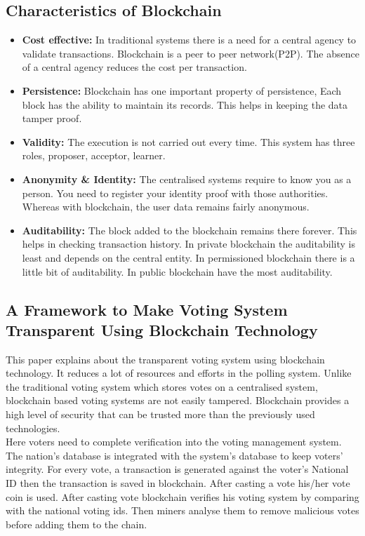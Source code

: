 \documentclass{IEEEtran}
\begin{document}
    \subsection{Characteristics of Blockchain \cite{viriyasitavat2019blockchain}}
      \begin{itemize}
        \item \textbf{Cost effective:} In traditional systems there is a need for a central agency to validate transactions. Blockchain is a peer to peer network(P2P). The absence of a central agency reduces the cost per transaction.
        \item \textbf{Persistence:} Blockchain has one important property of persistence, Each block has the ability to maintain its records. This helps in keeping the data tamper proof.
        \item \textbf{Validity:} The execution is not carried out every time. This system has three roles, proposer, acceptor, learner.
        \item \textbf{Anonymity \& Identity:} The centralised systems require to know you as a person. You need to register your identity proof with those authorities. Whereas with blockchain, the user data remains fairly anonymous.
        \item \textbf{Auditability:} The block added to the blockchain remains there forever. This helps in checking transaction history. In private blockchain the auditability is least and depends on the central entity. In permissioned blockchain there is a little bit of auditability. In public blockchain have the most auditability.
      \end{itemize}

    \subsection{A Framework to Make Voting System Transparent Using Blockchain Technology \cite{9787540}}
      This paper explains about the transparent voting system using blockchain technology. It reduces a lot of resources and efforts in the polling system. Unlike the traditional voting system which stores votes on a centralised system, blockchain based voting systems are not easily tampered. Blockchain provides a high level of security that can be trusted more than the previously used technologies.\\
      Here voters need to complete verification into the voting management system. The nation's database is integrated with the system's database to keep voters’ integrity. For every vote, a transaction is generated against the voter’s National ID then the transaction is saved in blockchain. After casting a vote his/her vote coin is used. After casting vote blockchain verifies his voting system by comparing with the national voting ids. Then miners analyse them to remove malicious votes before adding them to the chain.
\end{document}
